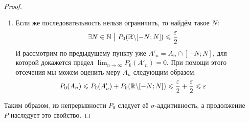 \begin{proof}
\begin{enumerate}
		\item Если же последовательность нельзя ограничить, то найдём такое $N$:
		\[
			\exists N \in \mathbb{N} \ \big|\  P_0(\mathbb{R} \backslash [-N; N]) \leqslant \frac{\varepsilon}{2}
		\]
		И рассмотрим по предыдущему пункту уже $A'_n = A_n \cap [-N; N]$, для которой докажется предел $\lim_{n \to \infty} P_0(A'_n) = 0$. При помощи этого отсечения мы можем оценить меру $A_n$ следующим образом:
		\[
			P_0(A_n) \leqslant P_0(A'_n) + P_0(\mathbb{R} \backslash [-N; N]) \leqslant \frac{\varepsilon}{2} + \frac{\varepsilon}{2} \leqslant \varepsilon
		\]
	\end{enumerate}
	Таким образом, из непрерывности $P_0$ следует её $\sigma$-аддитивность, а продолжение $P$ наследует это свойство.
\end{proof}